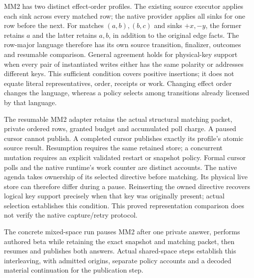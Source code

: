 \documentclass[10pt]{article}
\begin{document}
MM2 has two distinct effect-order profiles. The existing source executor
applies each sink across every matched row; the native provider applies all
sinks for one row before the next. For matches $(a,b),(b,c)$ and sinks
$+x,-y$, the former retains $a$ and the latter retains $a,b$, in addition to
the original edge facts. The row-major language therefore has its own source
transition, finalizer, outcomes and resumable comparison. General agreement
holds for physical-key support when every pair of instantiated writes either
has the same polarity or addresses different keys. This sufficient condition
covers positive insertions; it does not equate literal representatives, order,
receipts or work. Changing effect order changes the language, whereas a
policy selects among transitions already licensed by that language.

The resumable MM2 adapter retains the actual structural matching packet,
private ordered rows, granted budget and accumulated poll charge. A paused
cursor cannot publish. A completed cursor publishes exactly its profile's
atomic source result. Resumption requires the same retained store; a concurrent mutation
requires an explicit validated restart or snapshot policy. Formal cursor polls
and the native runtime's work counter are distinct accounts.
The native agenda takes ownership of its selected directive before matching.
Its physical live store can therefore differ during a pause. Reinserting the
owned directive recovers logical key support precisely when that key was
originally present; actual selection establishes this condition. This proved
representation comparison does not verify the native capture/retry protocol.

The concrete mixed-space run pauses MM2 after one private answer, performs
authored beta while retaining the exact snapshot and matching packet, then
resumes and publishes both answers. Actual shared-space steps establish this
interleaving, with admitted origins, separate policy accounts and a decoded
material continuation for the publication step.

\end{document}
